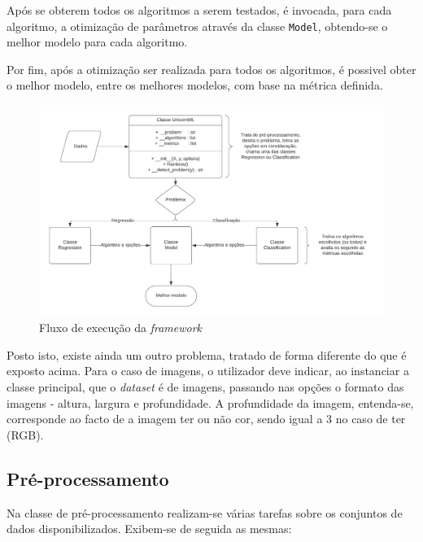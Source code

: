 \documentclass[a4paper]{report}
\begin{document}
{		Após se obterem todos os algoritmos a serem testados, é invocada, para cada algoritmo, a otimização de parâmetros através da classe \texttt{Model},
		obtendo-se o melhor modelo para cada algoritmo.

		Por fim, após a otimização ser realizada para todos os algoritmos, é possivel obter o melhor modelo, entre os melhores modelos, com base na métrica definida.

		\begin{figure}[H]
			\centering
			\includegraphics[width=1.0\textwidth]{Images/Diagram.png}
			\caption{Fluxo de execução da \textit{framework}}
			\label{fig:3}
		\end{figure}

		Posto isto, existe ainda um outro problema, tratado de forma diferente do que é exposto acima.
		Para o caso de imagens, o utilizador deve indicar, ao instanciar a classe principal, que o \textit{dataset} é de imagens, passando nas opções o formato das imagens - altura, largura e profundidade.
		A profundidade da imagem, entenda-se, corresponde ao facto de a imagem ter ou não cor, sendo igual a 3 no caso de ter (RGB).

		\subsection{Pré-processamento} \label{subsec:Pre-Processing}
		Na classe de pré-processamento realizam-se várias tarefas sobre os conjuntos de dados disponibilizados.
		Exibem-se de seguida as mesmas:

}
\end{document}
